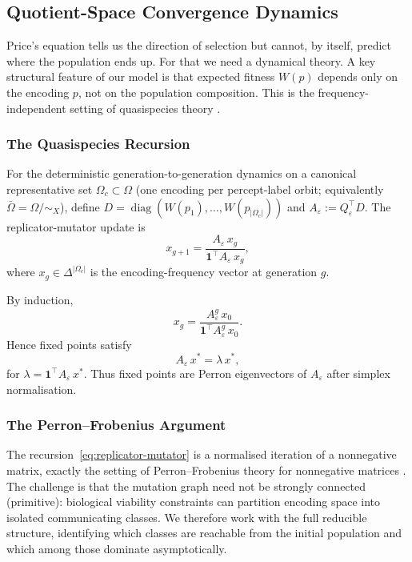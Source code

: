 \documentclass[12pt]{article}
\newcommand{\Obar}{\bar{\Omega}}
\newcommand{\diag}{\operatorname{diag}}
\begin{document}
\subsection{Quotient-Space Convergence Dynamics}\label{sec:quasispecies}

Price's equation tells us the direction of selection but cannot, by itself, predict where the population ends up. For that we need a dynamical theory. A key structural feature of our model is that expected fitness $W(p)$ depends only on the encoding $p$, not on the population composition. This is the frequency-independent setting of quasispecies theory \citep{eigen_1971,park_munoz_deem_2010}.

\subsubsection{The Quasispecies Recursion}\label{sec:recursion}

For the deterministic generation-to-generation dynamics on a canonical representative set $\Omega_c \subset \Omega$ (one encoding per percept-label orbit; equivalently $\Obar = \Omega/{\sim_X}$), define $D = \diag(W(p_1), \ldots, W(p_{|\Omega_c|}))$ and $A_\varepsilon := Q_\varepsilon^\top D$. The replicator-mutator update is
\begin{equation}\label{eq:replicator-mutator}
x_{g+1} = \frac{A_\varepsilon\, x_g}{\mathbf{1}^\top A_\varepsilon\, x_g},
\end{equation}
where $x_g \in \Delta^{|\Omega_c|}$ is the encoding-frequency vector at generation $g$.

By induction,
\begin{equation}
x_g = \frac{A_\varepsilon^g\, x_0}{\mathbf{1}^\top A_\varepsilon^g\, x_0}.
\end{equation}
Hence fixed points satisfy
\begin{equation}\label{eq:fixed-point}
A_\varepsilon\, x^* = \lambda\, x^*,
\end{equation}
for $\lambda = \mathbf{1}^\top A_\varepsilon\, x^*$. Thus fixed points are Perron eigenvectors of $A_\varepsilon$ after simplex normalisation.

\subsubsection{The Perron--Frobenius Argument}\label{sec:perron}

The recursion~\eqref{eq:replicator-mutator} is a normalised iteration of a nonnegative matrix, exactly the setting of Perron--Frobenius theory for nonnegative matrices \citep{seneta_2006}. The challenge is that the mutation graph need not be strongly connected (primitive): biological viability constraints can partition encoding space into isolated communicating classes. We therefore work with the full reducible structure, identifying which classes are reachable from the initial population and which among those dominate asymptotically.
\end{document}

